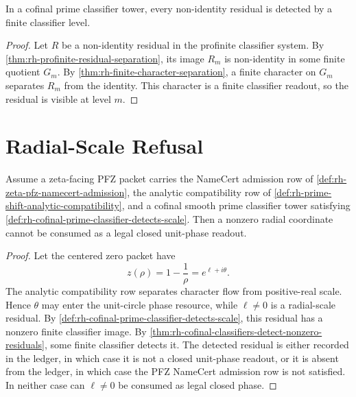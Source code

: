 \begin{theorem}
\label{thm:rh-cofinal-classifiers-detect-nonzero-residuals}
In a cofinal prime classifier tower, every non-identity residual is
detected by a finite classifier level.
\end{theorem}

\begin{proof}
Let $R$ be a non-identity residual in the profinite classifier system.
By \autoref{thm:rh-profinite-residual-separation}, its image $R_m$ is
non-identity in some finite quotient $G_m$.  By
\autoref{thm:rh-finite-character-separation}, a finite character on
$G_m$ separates $R_m$ from the identity.  This character is a finite
classifier readout, so the residual is visible at level $m$.
\end{proof}

\section{Radial-Scale Refusal}
\label{sec:rh-smooth-prime-radial-scale-refusal}

\begin{theorem}
\label{thm:rh-smooth-prime-classifier-tower-excludes-hidden-radial-scale}
Assume a zeta-facing PFZ packet carries the NameCert admission row of
\autoref{def:rh-zeta-pfz-namecert-admission}, the analytic compatibility
row of \autoref{def:rh-prime-shift-analytic-compatibility}, and a
cofinal smooth prime classifier tower satisfying
\autoref{def:rh-cofinal-prime-classifier-detects-scale}.  Then a
nonzero radial coordinate cannot be consumed as a legal closed
unit-phase readout.
\end{theorem}

\begin{proof}
Let the centered zero packet have
$$
z(\rho)=1-\frac1\rho=e^{\ell+i\theta}.
$$
The analytic compatibility row separates character flow from
positive-real scale.  Hence $\theta$ may enter the unit-circle phase
resource, while $\ell\ne0$ is a radial-scale residual.  By
\autoref{def:rh-cofinal-prime-classifier-detects-scale}, this residual
has a nonzero finite classifier image.  By
\autoref{thm:rh-cofinal-classifiers-detect-nonzero-residuals}, some
finite classifier detects it.  The detected residual is either recorded
in the ledger, in which case it is not a closed unit-phase readout, or
it is absent from the ledger, in which case the PFZ NameCert admission
row is not satisfied.  In neither case can $\ell\ne0$ be consumed as
legal closed phase.
\end{proof}

